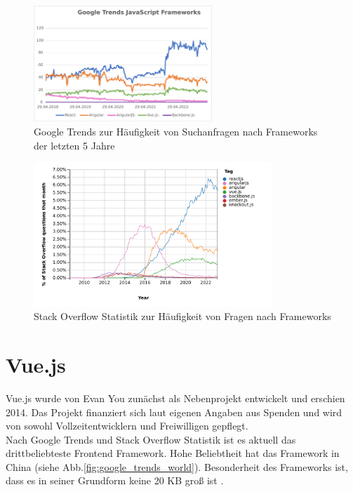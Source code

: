 \begin{figure}[H]
    \centering
    \includegraphics[width=0.6\textwidth]{img/Google Stats/google_frameworks_trends}
    \caption{Google Trends zur Häufigkeit von Suchanfragen nach Frameworks der letzten 5 Jahre \cite{googleTrends}}
    \label{fig:google_trends}
\end{figure}

\begin{figure}[H]
    \centering
    \includegraphics[width=0.8\textwidth]{img/js_frameworks_statistic_stackoverflow}
    \caption{Stack Overflow Statistik zur Häufigkeit von Fragen nach Frameworks \cite{stackoverflowStats}}
    \label{fig:stackoverflow_stat}
\end{figure}



\section{Vue.js}
Vue.js wurde von Evan You zunächst als Nebenprojekt entwickelt und erschien 2014.
Das Projekt finanziert sich laut eigenen Angaben aus Spenden und
wird von sowohl Vollzeitentwicklern und Freiwilligen gepflegt.  \cite{vueFAQ}
\\
Nach Google Trends  \cite{googleTrends} und Stack Overflow Statistik \cite{stackoverflowStats} ist es aktuell das drittbeliebteste
Frontend Framework.
Hohe Beliebtheit hat das Framework in China (siehe Abb.\ref{fig:google_trends_world}).
Besonderheit des Frameworks ist, dass es in seiner Grundform keine 20 KB groß ist \cite[S. 523]{bin2019}.

